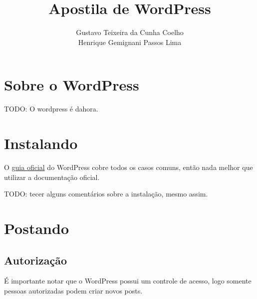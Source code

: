 \documentclass[12pt,onecolumn]{article}
\begin{document}
\title{Apostila de WordPress}
\author{Gustavo Teixeira da Cunha Coelho \\ Henrique Gemignani Passos Lima}
\maketitle

\section{Sobre o WordPress}
	TODO: O wordpress é dahora.

\section{Instalando}
	O \href{http://codex.wordpress.org/Installing_WordPress}{guia oficial} do 
	WordPress cobre todos os casos comuns, então nada melhor que utilizar a documentação oficial.
	
	TODO: tecer alguns comentários sobre a instalação, mesmo assim. \blindtext

\section{Postando}

	\subsection{Autorização}
		É importante notar que o WordPress possui um controle de acesso, logo 
		somente pessoas autorizadas podem criar novos posts.
		
\end{document}
